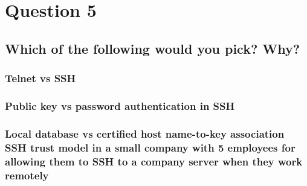 \documentclass{report}
\begin{document}
	\section{Question 5}
	\startsection
		\renewcommand{\thesubsection}{\thesection.\Alph{subsection}}
		\subsection{Which of the following would you pick? Why?}
		\startsubsection
			\subsubsection{Telnet vs SSH}
			\startsubsection
			\closesection
			\subsubsection{Public key vs password authentication in SSH}
			\startsubsection
			\closesection
			\subsubsection{Local database vs certified host name-to-key association SSH trust model in a small company with 5 employees for allowing them to SSH to a company server when they work remotely}
			\startsubsection
			\closesection
		\closesection
	\closesection
\end{document}
